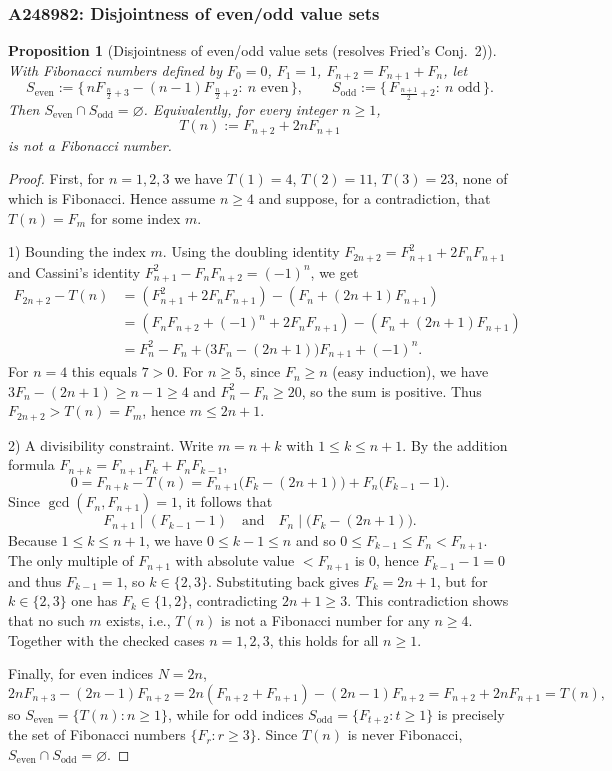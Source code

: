 \documentclass[12pt]{article}
\newtheorem{proposition}[theorem]{Proposition}
\theoremstyle{remark}
\begin{document}
\subsubsection{A248982: Disjointness of even/odd value sets}
\begin{proposition}[Disjointness of even/odd value sets (resolves Fried's Conj.~2)]\label{prop:disjointness}
With Fibonacci numbers defined by $F_0=0$, $F_1=1$, $F_{n+2}=F_{n+1}+F_n$, let
\[
 S_{\mathrm{even}}:=\bigl\{\,nF_{\,\frac{n}{2}+3}-(n-1)F_{\,\frac{n}{2}+2}:\ n\text{ even}\,\bigr\},\qquad
 S_{\mathrm{odd}}:=\bigl\{\,F_{\,\frac{n+1}{2}+2}:\ n\text{ odd}\,\bigr\}.
\]
Then $S_{\mathrm{even}}\cap S_{\mathrm{odd}}=\varnothing$. Equivalently, for every integer $n\ge1$,
\[
 T(n):=F_{n+2}+2nF_{n+1}
\]
is not a Fibonacci number.
\end{proposition}

\begin{proof}
First, for $n=1,2,3$ we have $T(1)=4$, $T(2)=11$, $T(3)=23$, none of which is Fibonacci. Hence assume $n\ge4$ and suppose, for a contradiction, that $T(n)=F_m$ for some index $m$.

1) Bounding the index $m$. Using the doubling identity $F_{2n+2}=F_{n+1}^2+2F_nF_{n+1}$ and Cassini's identity $F_{n+1}^2-F_nF_{n+2}=(-1)^n$, we get
\[
\begin{aligned}
F_{2n+2}-T(n)
&=(F_{n+1}^2+2F_nF_{n+1})-(F_n+(2n+1)F_{n+1})\\
&=(F_nF_{n+2}+(-1)^n+2F_nF_{n+1})-(F_n+(2n+1)F_{n+1})\\
&=F_n^2 - F_n + \bigl(3F_n-(2n+1)\bigr)F_{n+1} + (-1)^n.
\end{aligned}
\]
For $n=4$ this equals $7>0$. For $n\ge5$, since $F_n\ge n$ (easy induction), we have $3F_n-(2n+1)\ge n-1\ge4$ and $F_n^2-F_n\ge20$, so the sum is positive. Thus $F_{2n+2}>T(n)=F_m$, hence $m\le 2n+1$.

2) A divisibility constraint. Write $m=n+k$ with $1\le k\le n+1$. By the addition formula $F_{n+k}=F_{n+1}F_k+F_nF_{k-1}$,
\[
0=F_{n+k}-T(n)=F_{n+1}\bigl(F_k-(2n+1)\bigr)+F_n\bigl(F_{k-1}-1\bigr).
\]
Since $\gcd(F_n,F_{n+1})=1$, it follows that
\[
F_{n+1}\mid(F_{k-1}-1)\quad\text{and}\quad F_n\mid\bigl(F_k-(2n+1)\bigr).
\]
Because $1\le k\le n+1$, we have $0\le k-1\le n$ and so $0\le F_{k-1}\le F_n<F_{n+1}$. The only multiple of $F_{n+1}$ with absolute value $<F_{n+1}$ is $0$, hence $F_{k-1}-1=0$ and thus $F_{k-1}=1$, so $k\in\{2,3\}$. Substituting back gives $F_k=2n+1$, but for $k\in\{2,3\}$ one has $F_k\in\{1,2\}$, contradicting $2n+1\ge3$. This contradiction shows that no such $m$ exists, i.e., $T(n)$ is not a Fibonacci number for any $n\ge4$. Together with the checked cases $n=1,2,3$, this holds for all $n\ge1$.

Finally, for even indices $N=2n$,
\[
2nF_{n+3}-(2n-1)F_{n+2}=2n(F_{n+2}+F_{n+1})-(2n-1)F_{n+2}=F_{n+2}+2nF_{n+1}=T(n),
\]
so $S_{\mathrm{even}}=\{T(n):n\ge1\}$, while for odd indices $S_{\mathrm{odd}}=\{F_{t+2}:t\ge1\}$ is precisely the set of Fibonacci numbers $\{F_r:r\ge3\}$. Since $T(n)$ is never Fibonacci, $S_{\mathrm{even}}\cap S_{\mathrm{odd}}=\varnothing$.
\end{proof}
\end{document}

